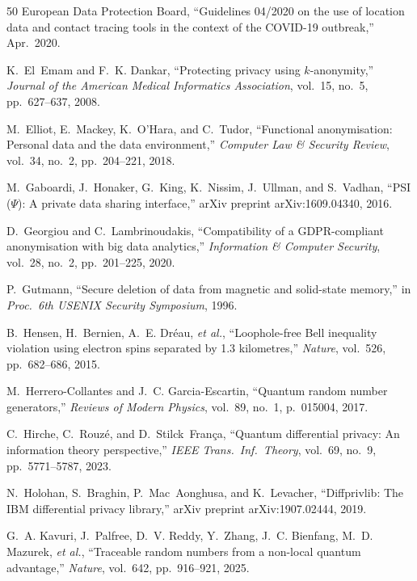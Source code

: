 \documentclass[journal]{IEEEtran}
\begin{document}
\begin{thebibliography}{50}
{European Data Protection Board}, ``Guidelines 04/2020 on the use of location data and contact tracing tools in the context of the {COVID-19} outbreak,'' Apr.\ 2020.

K.~El~Emam and F.~K. Dankar, ``Protecting privacy using $k$-anonymity,'' \emph{Journal of the American Medical Informatics Association}, vol.~15, no.~5, pp.~627--637, 2008.

M.~Elliot, E.~Mackey, K.~O'Hara, and C.~Tudor, ``Functional anonymisation: Personal data and the data environment,'' \emph{Computer Law \& Security Review}, vol.~34, no.~2, pp.~204--221, 2018.

M.~Gaboardi, J.~Honaker, G.~King, K.~Nissim, J.~Ullman, and S.~Vadhan, ``{PSI} ($\Psi$): A private data sharing interface,'' arXiv preprint arXiv:1609.04340, 2016.

D.~Georgiou and C.~Lambrinoudakis, ``Compatibility of a {GDPR}-compliant anonymisation with big data analytics,'' \emph{Information \& Computer Security}, vol.~28, no.~2, pp.~201--225, 2020.

P.~Gutmann, ``Secure deletion of data from magnetic and solid-state memory,'' in \emph{Proc.\ 6th USENIX Security Symposium}, 1996.

B.~Hensen, H.~Bernien, A.~E. Dr\'{e}au, \emph{et al.}, ``Loophole-free Bell inequality violation using electron spins separated by 1.3 kilometres,'' \emph{Nature}, vol.~526, pp.~682--686, 2015.

M.~Herrero-Collantes and J.~C. Garcia-Escartin, ``Quantum random number generators,'' \emph{Reviews of Modern Physics}, vol.~89, no.~1, p.~015004, 2017.

C.~Hirche, C.~Rouz\'{e}, and D.~Stilck~Fran\c{c}a, ``Quantum differential privacy: An information theory perspective,'' \emph{IEEE Trans.\ Inf.\ Theory}, vol.~69, no.~9, pp.~5771--5787, 2023.

N.~Holohan, S.~Braghin, P.~Mac~Aonghusa, and K.~Levacher, ``Diffprivlib: The {IBM} differential privacy library,'' arXiv preprint arXiv:1907.02444, 2019.

G.~A. Kavuri, J.~Palfree, D.~V. Reddy, Y.~Zhang, J.~C. Bienfang, M.~D. Mazurek, \emph{et al.}, ``Traceable random numbers from a non-local quantum advantage,'' \emph{Nature}, vol.~642, pp.~916--921, 2025.


\end{thebibliography}
\end{document}
